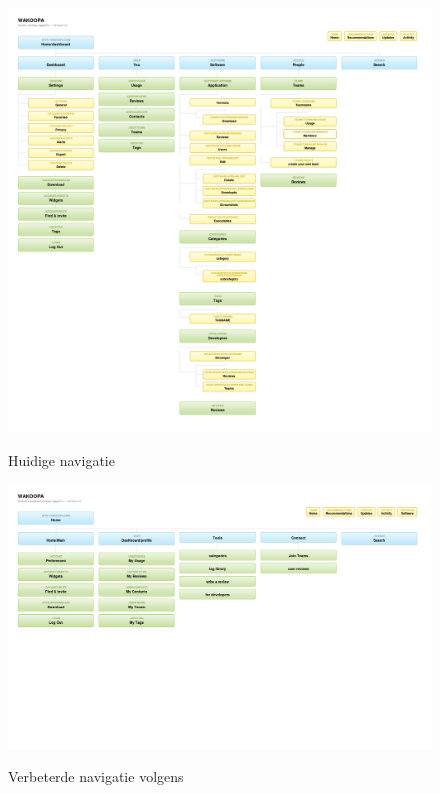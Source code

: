 \documentclass[a4paper, 10pt, pdftex]{report}
\begin{document}
      \begin{figure}
      \begin{center}
      \caption{Huidige navigatie}
        \includegraphics[width=\textwidth]{../images/currentnav}
      \label{currentnav}
      \end{center}
    \end{figure}

    \begin{figure}
      \begin{center}
      \caption{Verbeterde navigatie volgens \cite{Hoekman2008}}
        \includegraphics[width=\textwidth]{../images/miskeetonav}
      \label{miskeetonav}
      \end{center}
    \end{figure}
\end{document}
